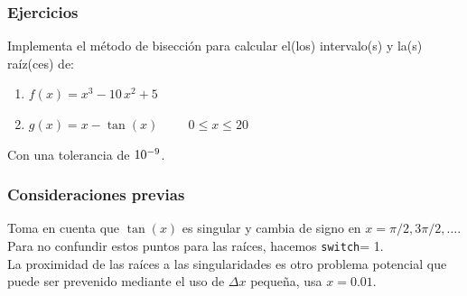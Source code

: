 \documentclass[12pt]{beamer}
\begin{document}
\begin{frame}
\frametitle{Ejercicios}
Implementa el método de bisección para calcular el(los) intervalo(s) y la(s) raíz(ces) de:
\pause
{}
\begin{enumerate}[<+->]
\item $f (x) = x^{3} - 10 \, x^{2} + 5$
\item $g (x) = x - \tan(x) \hspace{1cm} 0 \leq x \leq 20$
\end{enumerate}
Con una tolerancia de $\num{d-9}$.
\end{frame}
\begin{frame}
\frametitle{Consideraciones previas}
Toma en cuenta que $\tan(x)$ es singular y cambia de signo en $x = \pi/2, 3\pi/2,\ldots$. Para no confundir estos puntos para las raíces, hacemos \texttt{switch}= 1.
\\
\medskip
\pause
La proximidad de las raíces a las singularidades es otro problema potencial que puede ser prevenido mediante el uso de $\Delta x$ pequeña, usa $x = 0.01$.
\end{frame}
\end{document}
